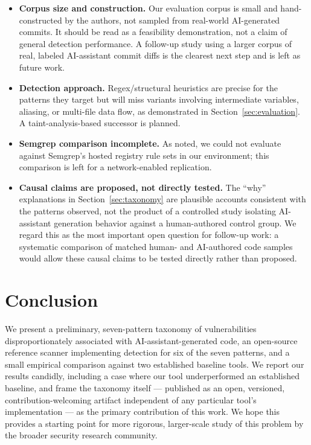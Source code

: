 \documentclass[11pt]{article}
\begin{document}
\begin{itemize}
  \item \textbf{Corpus size and construction.} Our evaluation corpus is
  small and hand-constructed by the authors, not sampled from real-world
  AI-generated commits. It should be read as a feasibility demonstration,
  not a claim of general detection performance. A follow-up study using a
  larger corpus of real, labeled AI-assistant commit diffs is the
  clearest next step and is left as future work.
  \item \textbf{Detection approach.} Regex/structural heuristics are
  precise for the patterns they target but will miss variants involving
  intermediate variables, aliasing, or multi-file data flow, as
  demonstrated in Section~\ref{sec:evaluation}. A taint-analysis-based
  successor is planned.
  \item \textbf{Semgrep comparison incomplete.} As noted, we could not
  evaluate against Semgrep's hosted registry rule sets in our
  environment; this comparison is left for a network-enabled replication.
  \item \textbf{Causal claims are proposed, not directly tested.} The
  ``why'' explanations in Section~\ref{sec:taxonomy} are plausible
  accounts consistent with the patterns observed, not the product of a
  controlled study isolating AI-assistant generation behavior against a
  human-authored control group. We regard this as the most important
  open question for follow-up work: a systematic comparison of matched
  human- and AI-authored code samples would allow these causal claims to
  be tested directly rather than proposed.
\end{itemize}

\section{Conclusion}

We present a preliminary, seven-pattern taxonomy of vulnerabilities
disproportionately associated with AI-assistant-generated code, an
open-source reference scanner implementing detection for six of the seven
patterns, and a small empirical comparison against two established
baseline tools. We report our results candidly, including a case where
our tool underperformed an established baseline, and frame the taxonomy
itself --- published as an open, versioned, contribution-welcoming
artifact independent of any particular tool's implementation --- as the
primary contribution of this work. We hope this provides a starting point
for more rigorous, larger-scale study of this problem by the broader
security research community.
\end{document}
